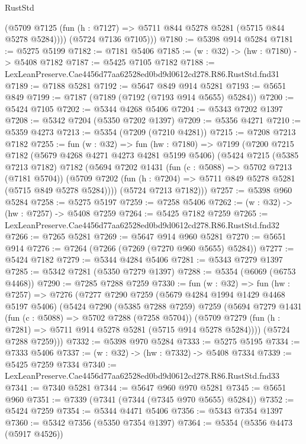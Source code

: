 \begin{lexlean}{RustStd}
\begin{coremodule}
          (@5709 @7125 (fun (h : @7127) => @5711 @844 @5278 @5281 (@5715 @844 @5278 @5284))))
        (@5724 @7136 @7105)))
@7180 := @5398 @914 @5284
@7181 := @5275 @5199
@7182 := @7181 @5406
@7185 := (w : @32) -> (hw : @7180) -> @5408 @7182
@7187 := @5425 @7105 @7182
@7188 := LexLeanPreserve.Cae4456d77aa62528ed0bd9d0612cd278.R86.RustStd.fnd31
@7189 := @7188 @5281
@7192 := @5647 @849 @914 @5281
@7193 := @5651 @849
@7199 := @7187 (@7189 (@7192 (@7193 @914 @5655) @5284))
@7200 := @5424 @7105
@7202 := @5344 @4268 @5406
@7204 := @5343 @7202 @1397
@7208 := @5342 @7204 (@5350 @7202 @1397)
@7209 := @5356 @4271
@7210 := @5359 @4273
@7213 := @5354 (@7209 (@7210 @4281))
@7215 := @7208 @7213 @7182
@7255 := fun (w : @32) =>
  fun (hw : @7180) =>
  @7199
    (@7200
      @7215
      @7182
      (@5679 @4268 @4271 @4273 @4281 @5199 @5406)
      (@5424
        @7215
        (@5385 @7213 @7182)
        @7182
        (@5694
          @7202
          @1431
          (fun (c : @5088) => @5702 @7213 (@7181 @5704))
          (@5709 @7202 (fun (h : @7204) => @5711 @849 @5278 @5281 (@5715 @849 @5278 @5284))))
        (@5724 @7213 @7182)))
@7257 := @5398 @960 @5284
@7258 := @5275 @5197
@7259 := @7258 @5406
@7262 := (w : @32) -> (hw : @7257) -> @5408 @7259
@7264 := @5425 @7182 @7259
@7265 := LexLeanPreserve.Cae4456d77aa62528ed0bd9d0612cd278.R86.RustStd.fnd32
@7266 := @7265 @5281
@7269 := @5647 @914 @960 @5281
@7270 := @5651 @914
@7276 := @7264 (@7266 (@7269 (@7270 @960 @5655) @5284))
@7277 := @5424 @7182
@7279 := @5344 @4284 @5406
@7281 := @5343 @7279 @1397
@7285 := @5342 @7281 (@5350 @7279 @1397)
@7288 := @5354 (@6069 (@6753 @4468))
@7290 := @7285 @7288 @7259
@7330 := fun (w : @32) =>
  fun (hw : @7257) =>
  @7276
    (@7277
      @7290
      @7259
      (@5679 @4284 @1994 @1429 @4468 @5197 @5406)
      (@5424
        @7290
        (@5385 @7288 @7259)
        @7259
        (@5694
          @7279
          @1431
          (fun (c : @5088) => @5702 @7288 (@7258 @5704))
          (@5709 @7279 (fun (h : @7281) => @5711 @914 @5278 @5281 (@5715 @914 @5278 @5284))))
        (@5724 @7288 @7259)))
@7332 := @5398 @970 @5284
@7333 := @5275 @5195
@7334 := @7333 @5406
@7337 := (w : @32) -> (hw : @7332) -> @5408 @7334
@7339 := @5425 @7259 @7334
@7340 := LexLeanPreserve.Cae4456d77aa62528ed0bd9d0612cd278.R86.RustStd.fnd33
@7341 := @7340 @5281
@7344 := @5647 @960 @970 @5281
@7345 := @5651 @960
@7351 := @7339 (@7341 (@7344 (@7345 @970 @5655) @5284))
@7352 := @5424 @7259
@7354 := @5344 @4471 @5406
@7356 := @5343 @7354 @1397
@7360 := @5342 @7356 (@5350 @7354 @1397)
@7364 := @5354 (@5356 @4473 (@5917 @4526))

\end{coremodule}
\end{lexlean}
